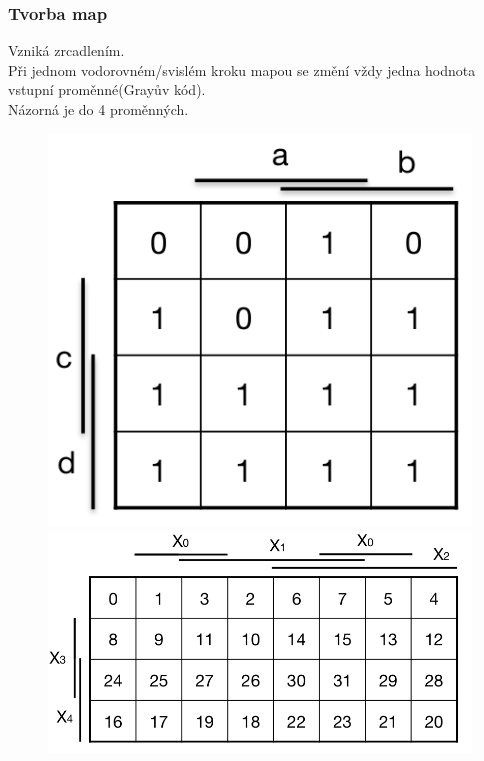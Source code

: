 \subsubsection*{Tvorba map}
Vzniká zrcadlením. \\
Při jednom vodorovném/svislém kroku mapou se změní vždy jedna hodnota vstupní proměnné(Grayův kód).\\
Názorná je do 4 proměnných. \\
\newpage
\begin{figure}[h!]
    \centering
    \begin{minipage}[b]{0.4\textwidth}
        \includegraphics[width=\textwidth]{img/Mapa4.png}
    \end{minipage}
    \hfill
    \begin{minipage}[b]{0.4\textwidth}
        \includegraphics[width=\textwidth]{img/Mapa5.png}
    \end{minipage}
\end{figure}

